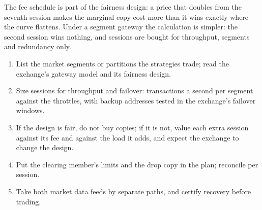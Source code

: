 \begin{omfigure}

\label{fig:nw:futures-connectivity:marginal}
\end{omfigure}

The fee schedule is part of the fairness design: a price that doubles from the seventh session makes the marginal copy cost more
than it wins exactly where the curve flattens. Under a segment gateway the calculation is simpler: the second session wins nothing,
and sessions are bought for throughput, segments and redundancy only.

\begin{method}\label{met:nw:futures-connectivity:plan}
\begin{enumerate}
\item List the market segments or partitions the strategies trade; read the exchange's gateway model and its fairness design.
\item Size sessions for throughput and failover: transactions a second per segment against the throttles, with backup addresses
  tested in the exchange's failover windows.
\item If the design is fair, do not buy copies; if it is not, value each extra session against its fee and against the load it
  adds, and expect the exchange to change the design.
\item Put the clearing member's limits and the drop copy in the plan; reconcile per session.
\item Take both market data feeds by separate paths, and certify recovery before trading.
\end{enumerate}
\end{method}

